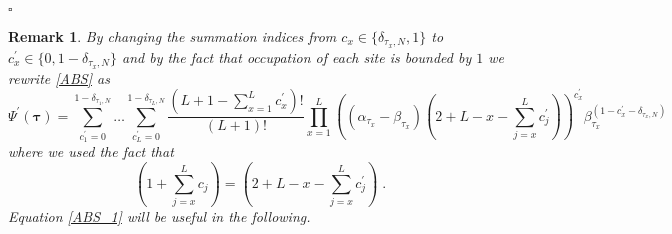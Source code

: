 \documentclass[10pt]{article}
\numberwithin{equation}{section}
\numberwithin{equation}{subsection}
\newtheorem{remark}{Remark}
\newcommand{\dt}{\;.}
\begin{document}
\begin{flushright}
    $\square$
\end{flushright}
\begin{remark} By changing the summation indices from $c_x\in \{\delta_{\tau_{x},N},1\}$ to $c_{x}^{'}\in \{0,1-\delta_{\tau_{x},N}\}$ and by  the fact that occupation of each site is bounded by $1$ we rewrite \eqref{ABS} as 
\begin{equation}\label{ABS_1}
	\Psi^{'}(\bm{\tau})=\sum_{c^{'}_{1}=0}^{1-\delta_{\tau_{1},N}}\ldots\sum_{c^{'}_{L}=0}^{1-\delta_{\tau_{L},N}}\frac{(L+1-\sum_{x=1}^{L}c^{'}_{x})!}{(L+1)!}\prod_{x=1}^{L}\left((\alpha_{\tau_{x}}-\beta_{\tau_{x}})\left(2+L-x-\sum_{j=x}^{L}c^{'}_{j}\right)\right)^{c^{'}_{x}}\beta_{\tau_{x}}^{(1-c^{'}_{x}-\delta_{\tau_{x},N})}
\end{equation}
where we used the fact that 
\begin{equation}
	\left(1+\sum_{j=x}^{L}c_{j}\right) =\left(2+L-x-\sum_{j=x}^{L}c^{'}_{j}\right)\dt
\end{equation}
Equation \eqref{ABS_1} will be useful in the following. 
\end{remark}
\end{document}

